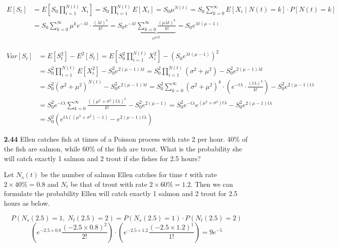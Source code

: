 \documentclass[12pt]{article}
\begin{document}
\begin{align}
   E[S_t] &= E\left[S_0 \prod_{i=1}^{N(t)} X_i\right] =\nonumber S_0\prod_{i=1}^{N(t)} E[X_i] = S_0 \mu^{N(t)} =S_0 \sum\limits_{k=0}^\infty E[X_i\;|\;N(t)=k]\cdot P[N(t)=k]\\ \nonumber
   &=S_0 \sum\limits_{k=0}^\infty \mu^k e^{-\lambda t} \cdot \frac{(\lambda t)^k}{k!}
    =S_0 e^{-\lambda t} \underbrace{\sum\limits_{k=0}^\infty \frac{(\mu\lambda t)^k}{k!}}_{e^{\mu\lambda t}}
    =S_0e^{\lambda t(\mu -1)} 
\end{align}

\begin{align}
    Var[S_t] &= E[S_t^2] - E^2[S_t] = E\left[S_0^2 \prod_{i=1}^{N(t)} X_i^2\right] - (S_0e^{\lambda t(\mu -1)})^2  \nonumber \\
    &= S_0^2\prod_{i=1}^{N(t)} E[X_i^2] - S_0^2e^{2(\mu-1)\lambda t}
    = S_0^2\prod_{i=1}^{N(t)} (\sigma^2 + \mu^2) - S_0^2e^{2(\mu-1)\lambda t}\nonumber \\
    &=S_0^2 (\sigma^2 + \mu^2)^{N(t)} - S_0^2e^{2(\mu-1)\lambda t} 
    = S_0^2\sum\limits_{k=0}^\infty (\sigma^2 + \mu^2)^k\cdot \left(
    e^{-t\lambda}\cdot \frac{(t\lambda)^k}{k!}\right) - S_0^2e^{2(\mu-1)t\lambda}\nonumber \\
    &=S_0^2e^{-t\lambda}\sum\limits_{k=0}^\infty \frac{((\mu^2+\sigma^2)t\lambda)^k}{k!}- S_0^2e^{2(\mu-1)}
    =S_0^2e^{-t\lambda} e^{(\mu^2+\sigma^2)t\lambda}- S_0^2e^{2(\mu-1)t\lambda}\nonumber\\
    &=S_0^2(e^{t\lambda((\mu^2+\sigma^2)-1)}-e^{2(\mu-1)t\lambda} )\nonumber
\end{align}

\vspace{2.5\baselineskip}
{\bf 2.44 }Ellen catches fish at times of a Poisson process with rate 2 per hour. 40\% of the fish are salmon, while 60\% of the fish are trout. What is the probability she will catch exactly 1 salmon and 2 trout if she fishes for 2.5 hours?

\vspace{1\baselineskip}
Let $N_s(t)$ be the number of salmon Ellen catches for time $t$ with rate $2\times 40\% = 0.8$ and $N_t$ be that of trout with rate $2\times 60\% = 1.2$. Then we can formulate the probability Ellen will catch exactly 1 salmon and 2 trout for 2.5 hours as below.

$$P(N_s(2.5)=1,\;N_t(2.5)=2) = P(N_s(2.5)=1)\cdot P(N_t(2.5)=2)$$
$$\left(e^{-2.5\times 0.8}\frac{(-2.5\times 0.8)^2}{2!}\right)\cdot
\left(e^{-2.5\times 1.2}\frac{(-2.5\times 1.2)^1}{1!}\right) 
=9e^{-5}$$
\end{document}
